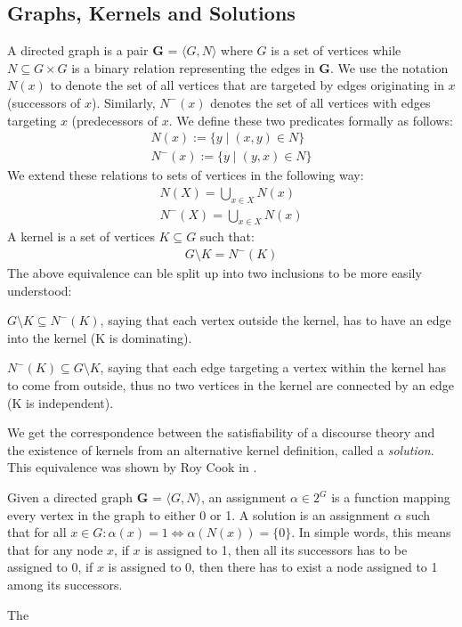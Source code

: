 \subsection{Graphs, Kernels and Solutions}
\label{sub:Graphs, Kernels and Solution}
A directed graph is a pair \textbf{G} = $\langle G,N \rangle$ where $G$ is a set of vertices while $N \subseteq G \times G$ is a binary relation representing the edges in \textbf{G}.
We use the notation $N(x)$ to denote the set of all vertices that are targeted by edges originating in $x$ (successors of $x$).
Similarly, $N^-(x)$ denotes the set of all vertices with edges targeting $x$ (predecessors of $x$.
We define these two predicates formally as follows:
\begin{align}
  N(x) := \{y \;|\; (x,y) \in N\}\\
  N^-(x) := \{ y \;|\; (y,x) \in N \}
\end{align}
We extend these relations to sets of vertices in the following way:
\begin{align}
  N(X) = \bigcup_{x \in X} N(x)\\
  N^-(X) = \bigcup_{x \in X} N(x)
\end{align}
A kernel is a set of vertices $K \subseteq G$ such that:
\begin{align}
  G \setminus K = N^-(K)
\end{align}
The above equivalence can ble split up into two inclusions to be more easily understood:

$G \setminus K \subseteq N^-(K)$, saying that each vertex outside the kernel, has to have an edge into the kernel (K is dominating).

$N^-(K) \subseteq G \setminus K$, saying that each edge targeting a vertex within the kernel has to come from outside, thus no two vertices in the kernel are connected by an edge (K is independent).

We get the correspondence between the satisfiability of a discourse theory and the existence of kernels from an alternative kernel definition, called a \textit{solution}. This equivalence was shown by Roy Cook in \cite{}.

Given a directed graph \textbf{G} = $\langle G,N \rangle$, an assignment $\alpha \in 2^G$ is a function mapping every vertex in the graph to either 0 or 1.  A solution is an assignment $\alpha$ such that for all $x \in G: \alpha(x) = 1 \iff \alpha(N(x)) = \{ 0 \}$.  In simple words, this means that for any node $x$, if $x$ is assigned to 1, then all its successors has to be assigned to 0, if $x$ is assigned to 0, then there has to exist a node assigned to 1 among its successors.

The 

